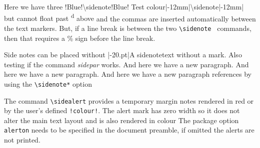 \documentclass[twoside,10pt,ragged]{article}
\begin{document}
Here we have three \sidenote!Blue!{\textsf{\upshape\textbackslash sidenote!Blue!} Test colour}\sidenote|-12mm|{\textsf{\upshape\textbackslash sidenote|-12mm|} but cannot float past \textsuperscript d above} and the commas are inserted automatically between the text markers. But, if a line break is between the two \verb"\sidenote " commands, then that requires a \% sign before the line break.

Side notes can be placed without \sidenotetext*|-20.pt|{A sidenotetext without a mark. Also testing if the command \emph{sidepar} works.
\sidepar And here we have a new paragraph. And here we have a new paragraph. And here we have a new paragraph} references by using the \verb"\sidenote*" option

The command \verb"\sidealert" provides a temporary margin notes rendered in red or by the user’s defined \verb"!colour!". The alert mark has zero width so it does not alter the main text layout and is also rendered in colour The package option \verb"alerton" needs to be specified in the document preamble, if omitted the alerts are not printed.
\end{document}
